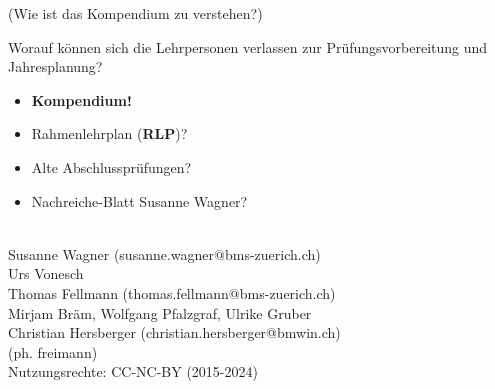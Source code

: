 {

(Wie ist das Kompendium zu verstehen?)

Worauf können sich die Lehrpersonen verlassen zur Prüfungsvorbereitung
und Jahresplanung?
\begin{itemize}
\item \textbf{Kompendium!}
\item Rahmenlehrplan (\textbf{RLP})?
\item Alte Abschlussprüfungen?
\item Nachreiche-Blatt Susanne Wagner?
\end{itemize}

\vspace{30mm}
\begin{center}\begin{small} \textbf{ }\\
Susanne Wagner (susanne.wagner@bms-zuerich.ch)\\
Urs Vonesch\\
Thomas Fellmann (thomas.fellmann@bms-zuerich.ch)\\
Mirjam Bräm, Wolfgang Pfalzgraf, Ulrike Gruber\\
Christian Hersberger (christian.hersberger@bmwin.ch)\\
(ph. freimann)\\
\vspace{2mm}
Nutzungsrechte: CC-NC-BY (2015-2024)

\end{small}%
\end{center}

\newpage


\tableofcontents{}
\newpage
\pagestyle{fancy}
}%
